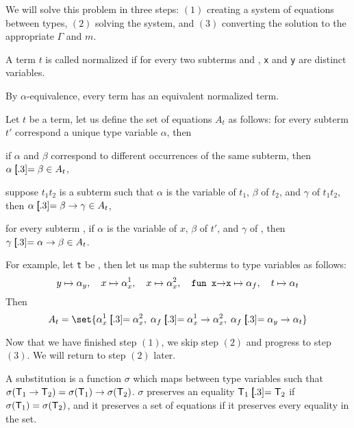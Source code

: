 \edefn

We will solve this problem in three steps: $(1)$ creating a system of equations between types, $(2)$ solving the system, and $(3)$ converting the solution to the appropriate $\Gamma$ and $m$.

\bdefn

    A term $t$ is called {\emphcolor normalized} if for every two subterms  and , {\tt x} and {\tt y} are distinct variables.

\edefn

By $\alpha$-equivalence, every term has an equivalent normalized term.

\bdefn

    Let $t$ be a term, let us define the set of equations $A_t$ as follows: for every subterm $t'$ correspond a unique type variable $\alpha$, then
    \benum
        \item if $\alpha$ and $\beta$ correspond to different occurrences of the same subterm, then $\alpha\eq\beta\in A_t$,
        \item suppose $t_1t_2$ is a subterm such that $\alpha$ is the variable of $t_1$, $\beta$ of $t_2$, and $\gamma$ of $t_1t_2$, then $\alpha\eq\beta\to\gamma\in A_t$,
        \item for every subterm , if $\alpha$ is the variable of $x$, $\beta$ of $t'$, and $\gamma$ of , then $\gamma\eq\alpha\to\beta\in A_t$.
    \eenum

\edefn

For example, let {\tt t} be , then let us map the subterms to type variables as follows:
$$ y\mapsto\alpha_y,\quad x\mapsto\alpha_x^1,\quad x\mapsto\alpha_x^2,\quad \lcalc{fun x\to x}\mapsto\alpha_f,\quad t\mapsto\alpha_t $$
Then
$$ A_t = \set{\alpha_x^1\eq\alpha_x^2,\;\alpha_f\eq\alpha^1_x\to\alpha^2_x,\;\alpha_f\eq\alpha_y\to\alpha_t} $$

Now that we have finished step $(1)$, we skip step $(2)$ and progress to step $(3)$.
We will return to step $(2)$ later.

\bdefn

    A {\emphcolor substitution} is a function $\sigma$ which maps between type variables such that $\sigma(\T_1\to\T_2)=\sigma(\T_1)\to\sigma(\T_2)$.
    $\sigma$ {\emphcolor preserves} an equality $\T_1\eq\T_2$ if $\sigma({\sf T}_1)=\sigma({\sf T}_2)$, and it preserves a set of equations if it preserves every equality in the set.

